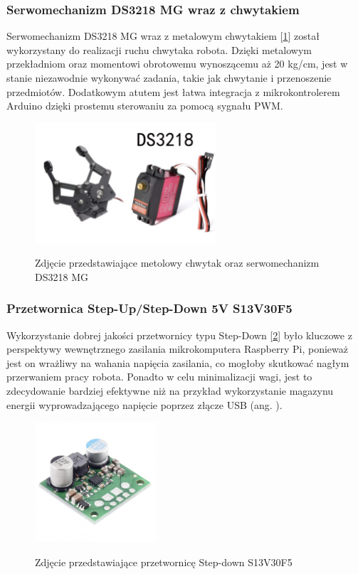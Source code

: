 \subsubsection*{Serwomechanizm DS3218 MG wraz z chwytakiem}
Serwomechanizm DS3218 MG wraz z metalowym chwytakiem [\ref{zdj:gripper}] został wykorzystany do realizacji ruchu chwytaka robota. Dzięki metalowym przekładniom oraz momentowi obrotowemu wynoszącemu aż 20 kg/cm, jest w stanie niezawodnie wykonywać zadania, takie jak chwytanie i przenoszenie przedmiotów. Dodatkowym atutem jest łatwa integracja z mikrokontrolerem Arduino dzięki prostemu sterowaniu za pomocą sygnału PWM. 


\begin{figure}[h!]
        \centering
        \includegraphics[width=0.6\textwidth]{./graf/gripper.png}
        \label{zdj:gripper}
        \caption{Zdjęcie przedstawiające metolowy chwytak oraz serwomechanizm DS3218 MG}
\end{figure}

\subsubsection*{Przetwornica Step-Up/Step-Down 5V S13V30F5}
Wykorzystanie dobrej jakości przetwornicy typu Step-Down [\ref{zdj:step-down}] było kluczowe z perspektywy wewnętrznego zasilania mikrokomputera Raspberry Pi, ponieważ jest on wrażliwy na wahania napięcia zasilania, co mogłoby skutkować nagłym przerwaniem pracy robota. Ponadto w celu minimalizacji wagi, jest to zdecydowanie bardziej efektywne niż na przykład wykorzystanie magazynu energii wyprowadzającego napięcie poprzez złącze USB (ang. ). 

\begin{figure}[h!]
        \centering
        \includegraphics[width=0.4\textwidth]{./graf/step-down.png}
        \label{zdj:step-down}
        \caption{Zdjęcie przedstawiające przetwornicę Step-down S13V30F5}
\end{figure}

